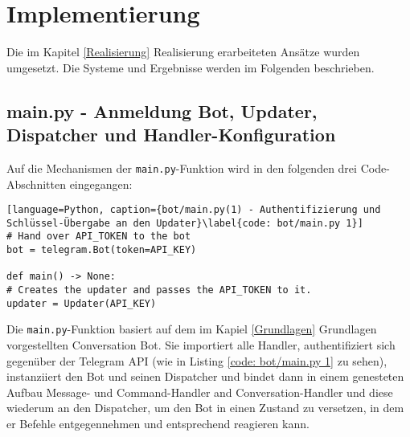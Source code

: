 \label{Implementierung}
\chapter{Implementierung}

    Die im Kapitel \ref*{Realisierung} Realisierung erarbeiteten Ansätze wurden umgesetzt. Die Systeme und Ergebnisse werden im Folgenden beschrieben.






    \section{main.py - Anmeldung Bot, Updater, Dispatcher und Handler-Konfiguration} \label{main.py}
        Auf die Mechanismen der \verb|main.py|-Funktion wird in den folgenden drei Code-Abschnitten eingegangen:
        \begin{lstlisting}[language=Python, caption={bot/main.py(1) - Authentifizierung und Schlüssel-Übergabe an den Updater}\label{code: bot/main.py 1}]
# Hand over API_TOKEN to the bot
bot = telegram.Bot(token=API_KEY)

def main() -> None:
# Creates the updater and passes the API_TOKEN to it.
updater = Updater(API_KEY)
        \end{lstlisting}
        Die \verb|main.py|-Funktion basiert auf dem im Kapiel \ref*{Grundlagen} Grundlagen vorgestellten Conversation Bot. Sie importiert alle Handler, authentifiziert sich gegenüber der Telegram API (wie in Listing \ref*{code: bot/main.py 1} zu sehen), instanziiert den Bot und seinen Dispatcher und bindet dann in einem genesteten Aufbau Message- und Command-Handler and Conversation-Handler und diese wiederum an den Dispatcher, um den Bot in einen Zustand zu versetzen, in dem er Befehle entgegennehmen und entsprechend reagieren kann. \\
        
